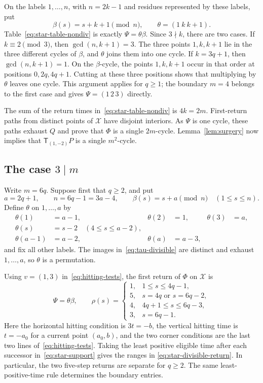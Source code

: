 \documentclass[11pt,reqno]{amsart}
\numberwithin{equation}{section}
\theoremstyle{definition}
\theoremstyle{remark}
\newcommand{\tr}{\mathsf T}
\begin{document}
On the labels $1,\ldots,n$, with $n=2k-1$ and residues represented by these
labels, put
\[
 \beta(s)=s+k+1\pmod n,\qquad \theta=(1\ k\ k+1).
\]
Table~\eqref{eq:star-table-nondiv} is exactly $\Psi=\theta\beta$.
Since $3\nmid k$, there are two cases. If $k\equiv2\pmod3$, then
$\gcd(n,k+1)=3$. The three points $1,k,k+1$ lie in the three different cycles of
$\beta$, and $\theta$ joins them into one cycle. If $k=3q+1$, then
$\gcd(n,k+1)=1$. On the $\beta$-cycle, the points $1,k,k+1$ occur in that order at
positions $0,2q,4q+1$. Cutting at these three positions shows that multiplying by
$\theta$ leaves one cycle. This argument applies for $q\ge1$; the boundary
$m=4$ belongs to the first case and gives $\Psi=(1\,2\,3)$ directly.

The sum of the return times in~\eqref{eq:star-table-nondiv} is $4k=2m$.
First-return paths from distinct points of $\mathcal X$ have disjoint interiors.
As $\Psi$ is one cycle, these paths exhaust $Q$ and prove that $\Phi$ is a single
$2m$-cycle. Lemma~\ref{lem:surgery} now implies that $\tr_{(1,-2)}P$ is a single
$m^2$-cycle.

\subsection{The case \texorpdfstring{$3\mid m$}{3 divides m}}
Write $m=6q$. Suppose first that $q\ge2$, and put
\[
 a=2q+1,\qquad n=6q-1=3a-4,\qquad
 \beta(s)=s+a\pmod n\quad(1\le s\le n).
\]
Define $\theta$ on $1,\ldots,a$ by
\begin{equation}\label{eq:tau-divisible}
\begin{aligned}
 \theta(1)&=a-1,&\theta(2)&=1,&\theta(3)&=a,\\
 \theta(s)&=s-2\quad(4\le s\le a-2),&&&\\[-2pt]
 \theta(a-1)&=a-2,&\theta(a)&=a-3,
\end{aligned}
\end{equation}
and fix all other labels. The images in~\eqref{eq:tau-divisible} are distinct
and exhaust $1,\ldots,a$, so $\theta$ is a permutation.

Using $v=(1,3)$ in~\eqref{eq:hitting-tests}, the first return of $\Phi$ on
$\mathcal X$ is
\begin{equation}\label{eq:star-divisible-return}
 \Psi=\theta\beta,
 \qquad
 \rho(s)=
 \begin{cases}
 1,&1\le s\le4q-1,\\
 5,&s=4q\text{ or }s=6q-2,\\
 4,&4q+1\le s\le6q-3,\\
 3,&s=6q-1.
 \end{cases}
\end{equation}
Here the horizontal hitting condition is $3t=-b$, the vertical hitting time is
$t=-a_0$ for a current point $(a_0,b)$, and the two corner conditions are the last
two lines of~\eqref{eq:hitting-tests}. Taking the least positive eligible time
after each successor in~\eqref{eq:star-support} gives the ranges in
\eqref{eq:star-divisible-return}. In particular, the two five-step returns are
separate for $q\ge2$. The same least-positive-time rule determines the boundary entries.
\end{document}
